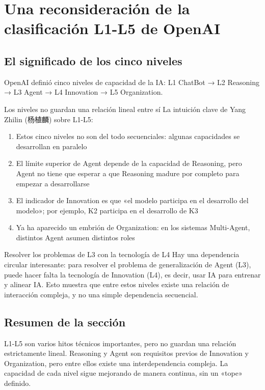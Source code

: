 \section{Una reconsideración de la clasificación L1-L5 de OpenAI}

\subsection{El significado de los cinco niveles}

OpenAI definió cinco niveles de capacidad de la IA: L1 ChatBot → L2 Reasoning → L3 Agent → L4 Innovation → L5 Organization.

\begin{importantbox}{Los niveles no guardan una relación lineal entre sí}
La intuición clave de Yang Zhilin (杨植麟) sobre L1-L5:
\begin{enumerate}
    \item Estos cinco niveles no son del todo secuenciales: algunas capacidades se desarrollan en paralelo
    \item El límite superior de Agent depende de la capacidad de Reasoning, pero Agent no tiene que esperar a que Reasoning madure por completo para empezar a desarrollarse
    \item El indicador de Innovation es que «el modelo participa en el desarrollo del modelo»; por ejemplo, K2 participa en el desarrollo de K3
    \item Ya ha aparecido un embrión de Organization: en los sistemas Multi-Agent, distintos Agent asumen distintos roles
\end{enumerate}
\end{importantbox}

\begin{knowledgebox}{Resolver los problemas de L3 con la tecnología de L4}
Hay una dependencia circular interesante: para resolver el problema de generalización de Agent (L3), puede hacer falta la tecnología de Innovation (L4), es decir, usar IA para entrenar y alinear IA. Esto muestra que entre estos niveles existe una relación de interacción compleja, y no una simple dependencia secuencial.
\end{knowledgebox}

\subsection{Resumen de la sección}

L1-L5 son varios hitos técnicos importantes, pero no guardan una relación estrictamente lineal. Reasoning y Agent son requisitos previos de Innovation y Organization, pero entre ellos existe una interdependencia compleja. La capacidad de cada nivel sigue mejorando de manera continua, sin un «tope» definido.
